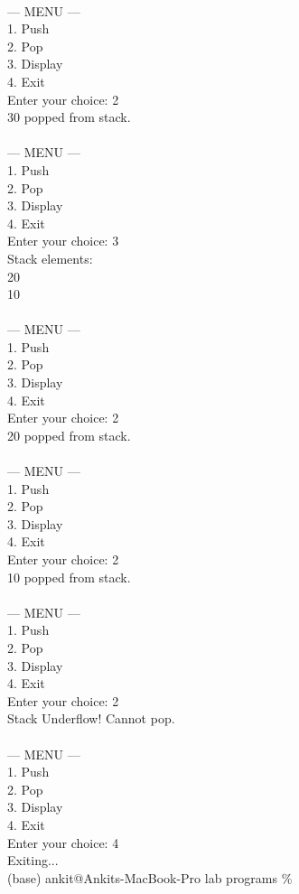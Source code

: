 \documentclass[12pt,a4paper]{article}
\begin{document}
\begin{tcolorbox}[terminalstyle, title=Sample Output]
{\\
--- MENU ---\\
1. Push\\
2. Pop\\
3. Display\\
4. Exit\\
Enter your choice: 2\\
30 popped from stack.\\
\\
--- MENU ---\\
1. Push\\
2. Pop\\
3. Display\\
4. Exit\\
Enter your choice: 3\\
Stack elements:\\
20\\
10\\
\\
--- MENU ---\\
1. Push\\
2. Pop\\
3. Display\\
4. Exit\\
Enter your choice: 2\\
20 popped from stack.\\
\\
--- MENU ---\\
1. Push\\
2. Pop\\
3. Display\\
4. Exit\\
Enter your choice: 2\\
10 popped from stack.\\
\\
--- MENU ---\\
1. Push\\
2. Pop\\
3. Display\\
4. Exit\\
Enter your choice: 2\\
Stack Underflow! Cannot pop.\\
\\
--- MENU ---\\
1. Push\\
2. Pop\\
3. Display\\
4. Exit\\
Enter your choice: 4\\
Exiting...\\
(base) ankit@Ankits-MacBook-Pro lab programs \%
}
\end{tcolorbox}
\end{document}

